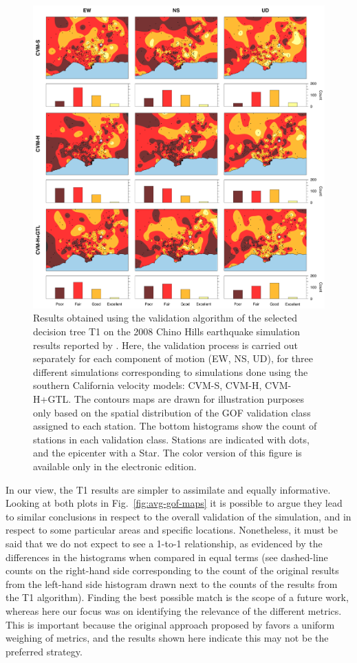 \begin{figure}%
	\centering
	\includegraphics[width=\textwidth]{figures/pdf/figure-10}
	\caption{Results obtained using the validation algorithm of the selected decision tree T1 on the 2008 Chino Hills earthquake simulation results reported by \citet{Taborda_2014_BSSA}. Here, the validation process is carried out separately for each component of motion (EW, NS, UD), for three different simulations corresponding to simulations done using the southern California velocity models: CVM-S, CVM-H, CVM-H+GTL. The contours maps are drawn for illustration purposes only based on the spatial distribution of the GOF validation class assigned to each station. The bottom histograms show the count of stations in each validation class. Stations are indicated with dots, and the epicenter with a Star. The color version of this figure is available only in the electronic edition.}
	\label{fig:res-gof-maps}
\end{figure}

In our view, the T1 results are simpler to assimilate and equally informative. Looking at both plots in Fig.~\ref{fig:avg-gof-maps} it is possible to argue they lead to similar conclusions in respect to the overall validation of the simulation, and in respect to some particular areas and specific locations. Nonetheless, it must be said that we do not expect to see a 1-to-1 relationship, as evidenced by the differences in the histograms when compared in equal terms (see dashed-line counts on the right-hand side corresponding to the count of the original results from the left-hand side histogram drawn next to the counts of the results from the T1 algorithm). Finding the best possible match is the scope of a future work, whereas here our focus was on identifying the relevance of the different metrics. This is important because the original approach proposed by \citet{Anderson_2004_Proc} favors a uniform weighing of metrics, and the results shown here indicate this may not be the preferred strategy.

